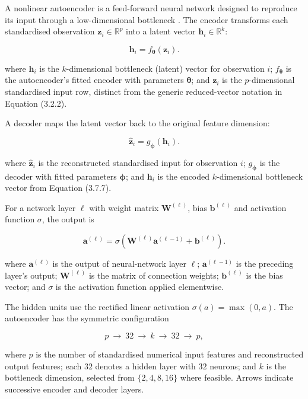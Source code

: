 A nonlinear autoencoder is a feed-forward neural network designed to
reproduce its input through a low-dimensional bottleneck \citep{Hinton2006}. The encoder transforms each standardised
observation \(\boldsymbol{z}_i\in\mathbb{R}^{p}\) into a latent vector
\(\boldsymbol{h}_i\in\mathbb{R}^{k}\):

\[
\boldsymbol{h}_i=f_{\boldsymbol{\theta}}(\boldsymbol{z}_i).\tag{3.7.7}
\]

\noindent where \(\boldsymbol{h}_i\) is the \(k\)-dimensional bottleneck (latent)
vector for observation \(i\); \(f_{\boldsymbol{\theta}}\) is the
autoencoder's fitted encoder with parameters \(\boldsymbol{\theta}\);
and \(\boldsymbol{z}_i\) is the \(p\)-dimensional standardised input
row, distinct from the generic reduced-vector notation in Equation
(3.2.2).

\noindent A decoder maps the latent vector back to the original feature dimension:

\[
\widehat{\boldsymbol{z}}_i=
g_{\boldsymbol{\phi}}(\boldsymbol{h}_i).\tag{3.7.8}
\]

\noindent where \(\widehat{\boldsymbol{z}}_i\) is the reconstructed standardised
input for observation \(i\); \(g_{\boldsymbol{\phi}}\) is the decoder
with fitted parameters \(\boldsymbol{\phi}\); and \(\boldsymbol{h}_i\)
is the encoded \(k\)-dimensional bottleneck vector from Equation
(3.7.7).

\noindent For a network layer \(\ell\) with weight matrix
\(\boldsymbol{W}^{(\ell)}\), bias \(\boldsymbol{b}^{(\ell)}\) and
activation function \(\sigma\), the output is

\[
\boldsymbol{a}^{(\ell)}
=\sigma\left(
\boldsymbol{W}^{(\ell)}\boldsymbol{a}^{(\ell-1)}
+\boldsymbol{b}^{(\ell)}
\right).\tag{3.7.9}
\]

\noindent where \(\boldsymbol{a}^{(\ell)}\) is the output of neural-network layer
\(\ell\); \(\boldsymbol{a}^{(\ell-1)}\) is the preceding layer's output;
\(\boldsymbol{W}^{(\ell)}\) is the matrix of connection weights;
\(\boldsymbol{b}^{(\ell)}\) is the bias vector; and \(\sigma\) is the
activation function applied elementwise.

\noindent The hidden units use the rectified linear activation
\(\sigma(a)=\max(0,a)\). The autoencoder has the symmetric configuration

\[
p\ \longrightarrow\ 32\ \longrightarrow\ k\
\longrightarrow\ 32\ \longrightarrow\ p,\tag{3.7.10}
\]

\noindent where \(p\) is the number of standardised numerical input features and
reconstructed output features; each \(32\) denotes a hidden layer with
\(32\) neurons; and \(k\) is the bottleneck dimension, selected from
\(\{2,4,8,16\}\) where feasible. Arrows indicate successive encoder and decoder layers.


